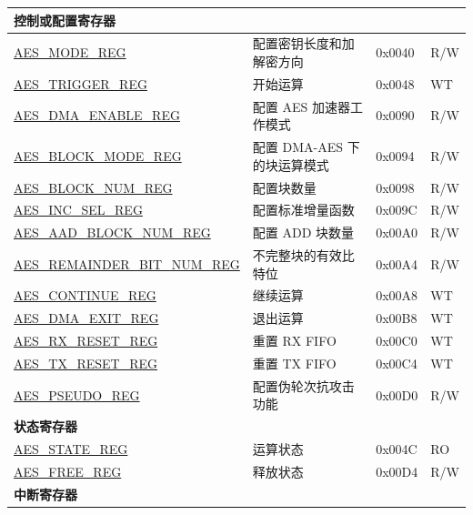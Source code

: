 \begin{longtable}{ | p{5.2cm} | p{6.6cm} | p{2cm} | p{1.2cm} | }
\multicolumn{4}{|l|}{\textbf{控制或配置寄存器}} \\ \hline

\hyperref[regdesc:AESMODEREG]{AES\_MODE\_REG}				            & 配置密钥长度和加解密方向			    & 0x0040 & R/W \\ \hline
\hyperref[regdesc:AESTRIGGERREG]{AES\_TRIGGER\_REG}			&	开始运算		& 0x0048 & WT \\ \hline
\hyperref[regdesc:AESDMAENABLEREG]{AES\_DMA\_ENABLE\_REG}		        &	配置 AES 加速器工作模式					                & 0x0090 & R/W \\ \hline
\hyperref[regdesc:AESBLOCKMODEREG]{AES\_BLOCK\_MODE\_REG}		        &	配置 DMA-AES 下的块运算模式			        & 0x0094 & R/W \\ \hline
\hyperref[regdesc:AESBLOCKNUMREG]{AES\_BLOCK\_NUM\_REG}		   	        &	配置块数量			        & 0x0098 & R/W \\ \hline
\hyperref[regdesc:AESINCSELREG]{AES\_INC\_SEL\_REG}			            &	配置标准增量函数               & 0x009C & R/W \\ \hline
\hyperref[regdesc:AESAADBLOCKNUMREG]{AES\_AAD\_BLOCK\_NUM\_REG} &  配置 ADD 块数量  & 0x00A0 & R/W \\ \hline
\hyperref[regdesc:AESREMAINDERBITNUMREG]{AES\_REMAINDER\_BIT\_NUM\_REG} &  不完整块的有效比特位  & 0x00A4 & R/W \\ \hline
\hyperref[regdesc:AESCONTINUEREG]{AES\_CONTINUE\_REG} &  继续运算               & 0x00A8 & WT \\ \hline
\hyperref[regdesc:AESDMAEXITREG]{AES\_DMA\_EXIT\_REG}		&	退出运算	& 0x00B8 & WT \\ \hline
\hyperref[regdesc:AESRXRESETREG]{AES\_RX\_RESET\_REG} & 重置 RX FIFO & 0x00C0 & WT \\ \hline
\hyperref[regdesc:AESTXRESETREG]{AES\_TX\_RESET\_REG} & 重置 TX FIFO & 0x00C4 & WT \\ \hline
\hyperref[regdesc:AESPSEUDOREG]{AES\_PSEUDO\_REG}				            & 配置伪轮次抗攻击功能			    & 0x00D0 & R/W \\ \hline

\multicolumn{4}{|l|}{\textbf{状态寄存器}} \\ \hline

\hyperref[regdesc:AESSTATEREG]{AES\_STATE\_REG}				&	运算状态			& 0x004C & RO \\ \hline
\hyperref[regdesc:AESFREEREG]{AES\_FREE\_REG} & 释放状态 & 0x00D4 & R/W \\ \hline

\multicolumn{4}{|l|}{\textbf{中断寄存器}} \\ \hline


\end{longtable}
